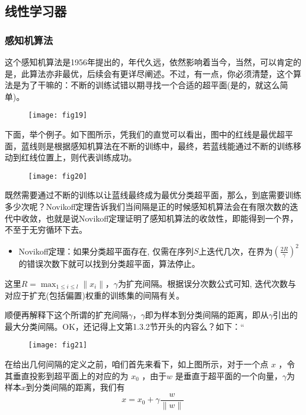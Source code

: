 \documentclass[a4paper,12pt]{article}
\begin{document}
\subsection{线性学习器}
\subsubsection{感知机算法}
这个感知机算法是1956年提出的，年代久远，依然影响着当今，当然，可以肯定的是，此算法亦非最优，后续会有更详尽阐述。不过，有一点，你必须清楚，这个算法是为了干嘛的：不断的训练试错以期寻找一个合适的超平面(是的，就这么简单)。
\begin{figure}[H]
  \centering
  \texttt{[image: fig19]}
\end{figure}

下面，举个例子。如下图所示，凭我们的直觉可以看出，图中的红线是最优超平面，蓝线则是根据感知机算法在不断的训练中，最终，若蓝线能通过不断的训练移动到红线位置上，则代表训练成功。


\begin{figure}[H]
  \centering
  \texttt{[image: fig20]}
\end{figure}

既然需要通过不断的训练以让蓝线最终成为最优分类超平面，那么，到底需要训练多少次呢？Novikoff定理告诉我们当间隔是正的时候感知机算法会在有限次数的迭代中收敛，也就是说Novikoff定理证明了感知机算法的收敛性，即能得到一个界，不至于无穷循环下去。

\begin{itemize}
\item Novikoff定理：如果分类超平面存在, 仅需在序列$S$上迭代几次，在界为$\left(\frac{2R}{\gamma}\right)^2$的错误次数下就可以找到分类超平面，算法停止。
\end{itemize}

这里$R=\max_{1\leq i\leq l}\|x_i\|$，$\gamma$为扩充间隔。根据误分次数公式可知, 迭代次数与对应于扩充(包括偏置)权重的训练集的间隔有关。

顺便再解释下这个所谓的扩充间隔$\gamma$，$\gamma$即为样本到分类间隔的距离，即从$\gamma$引出的最大分类间隔。OK，还记得上文第1.3.2节开头的内容么？如下：“
\begin{figure}[H]
  \centering
  \texttt{[image: fig21]}
\end{figure}
在给出几何间隔的定义之前，咱们首先来看下，如上图所示，对于一个点 $x$ ，令其垂直投影到超平面上的对应的为 $x_0$ ，由于$ w$ 是垂直于超平面的一个向量，$\gamma$为样本$x$到分类间隔的距离，我们有
\begin{equation}
  x=x_0+\gamma\frac{w}{\|w\|}
\end{equation}
\end{document}

